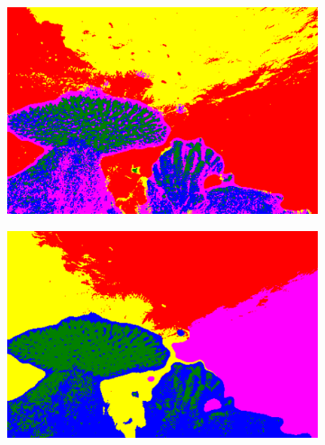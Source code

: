 \begin{figure}[h!]
\begin{subfigure}[t]{0.32\textwidth}
	\end{subfigure}
	\hfill
	\begin{subfigure}[t]{0.32\textwidth}
		\centering
		\includegraphics[width=\textwidth,keepaspectratio]{images/gen/optims/101027.jpg_blur.png}
	\end{subfigure}
	\hfill
	\begin{subfigure}[t]{0.32\textwidth}
		\centering
		\includegraphics[width=\textwidth,keepaspectratio]{images/gen/optims/101027.jpg_blur_norm_spatial.png}
	\end{subfigure}
	\hfill
	\begin{subfigure}[t]{0.32\textwidth}
		\centering

\end{subfigure}
\end{figure}
